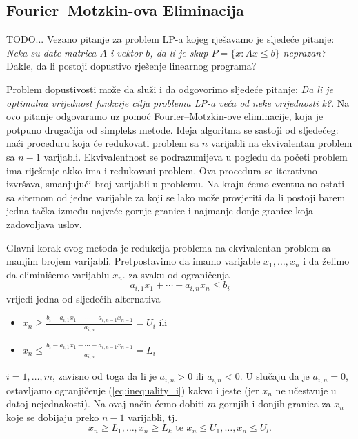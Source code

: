 \documentclass[a4paper, utf8, 11pt, colorlinks]{article}
\begin{document}
\subsection{Fourier–Motzkin-ova Eliminacija}
TODO...%
Vezano pitanje za problem  LP-a kojeg rješavamo je sljedeće pitanje:
\emph{Neka su date matrica $A$ i vektor $b$, da li je skup $P = \{x: A x \leq b\}$ neprazan?} Dakle, da li postoji dopustivo rješenje linearnog programa? 

Problem dopustivosti može da služi i da odgovorimo sljedeće pitanje: 
\emph{Da li je optimalna vrijednost funkcije cilja problema LP-a veća od neke vrijednosti k?}.
 Na ovo pitanje odgovaramo uz pomoć Fourier–Motzkin-ove eliminacije, koja je potpuno drugačija od simpleks metode.  Ideja algoritma se sastoji od sljedećeg: naći proceduru koja će redukovati problem sa $n$ varijabli na ekvivalentan problem sa $n-1$ varijabli. Ekvivalentnost se podrazumijeva u pogledu da početi problem ima riješenje akko ima i redukovani problem. Ova procedura se iterativno izvršava, smanjujući broj varijabli u problemu. Na kraju ćemo eventualno ostati sa sitemom od jedne varijable za koji se lako može provjeriti da li postoji barem jedna tačka između najveće gornje granice i najmanje donje granice koja zadovoljava uslov. 
 
 Glavni korak ovog metoda je redukcija problema na ekvivalentan problem sa manjim brojem varijabli. Pretpostavimo da imamo varijable $x_1,\ldots, x_n$ i da želimo da eliminišemo varijablu $x_n$. za svaku od ograničenja
 \begin{equation}\label{eq:inequality_i}
      a_{i,1} x_1 + \cdots + a_{i,n} x_n \leq b_i
 \end{equation}
 vrijedi jedna od sljedećih alternativa 
 \begin{itemize}
 	 \item  $x_n \geq \frac{b_i - a_{i,1}x_1- \cdots - a_{i, n-1} x_{n-1} }{a_{i,n}}=U_i$ ili 
 	 \item   $x_n \leq \frac{b_i - a_{i,1}x_1- \cdots - a_{i, n-1} x_{n-1} }{a_{i,n}}=L_i$
 \end{itemize}
 $i=1,\ldots, m$, zavisno od toga da li je $a_{i,n} >0$ ili $a_{i,n} <0$. U slučaju da je $a_{i,n} = 0$,  ostavljamo  ogranjičenje (\ref{eq:inequality_i}) kakvo i jeste (jer $x_n$ ne učestvuje u datoj nejednakosti). Na ovaj način ćemo dobiti $m$ gornjih i donjih granica za $x_n$ koje se dobijaju preko $n-1$ varijabli, tj. 
 $$  x_n \geq L_1, \ldots, x_n\geq L_k \mbox{ te }  x_n \leq U_1, \ldots, x_n \leq U_l.$$
  
\end{document}
